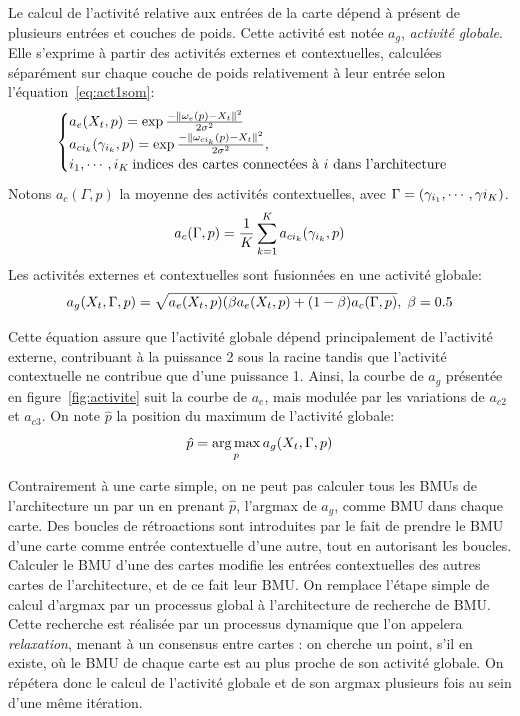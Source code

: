 Le calcul de l'activité relative aux entrées de la carte dépend à présent de plusieurs entrées et couches de poids. Cette activité est notée $a_g$, \emph{activité globale}.
Elle s'exprime à partir des activités externes et contextuelles, calculées séparément sur chaque couche de poids relativement à leur entrée selon l'équation~\ref{eq:act1som}:
\begin{equation}
\label{eq:activite}
\begin{cases}
a_e(X_t,p) = \exp\frac{-\lVert \omega_e(p)-X_t \rVert^2}{2\sigma^2} \\
a_{ci_k}(\gamma_{i_k},p) = \exp\frac{-\lVert \omega_{ci_k}(p)-X_t \rVert ^2}{2\sigma^2}, \\
i_1, \cdots, i_K\: \text{indices des cartes connectées à $i$ dans l'architecture}
\end{cases}
\end{equation}
Notons $a_c(\Gamma,p)$ la moyenne des activités contextuelles, avec $\Gamma = (\gamma_{i_1}, \cdots, \gamma{i_K})$.
\begin{equation}
a_c(\Gamma,p) = \frac{1}{K}\sum_{k=1}^K {a_{ci_k}(\gamma_{i_k},p)}
\end{equation}
Les activités externes et contextuelles sont fusionnées en une activité globale:
\begin{equation}
\label{eq:global_act}
a_g(X_t,\Gamma,p) = \sqrt{a_e(X_t,p)(\beta a_e(X_t,p) + (1-\beta) a_c(\Gamma,p)}, \; \beta=0.5
\end{equation} 

Cette équation assure que l'activité globale dépend principalement de l'activité externe, contribuant à la puissance 2 sous la racine tandis que l'activité contextuelle ne contribue que d'une puissance 1. Ainsi, la courbe de $a_g$ présentée en figure~\ref{fig:activite} suit la courbe de $a_e$, mais modulée par les variations de $a_{c2}$ et $a_{c3}$.
On note $\hat{p}$ la position du maximum de l'activité globale:
\begin{equation}
\label{argmax}
\hat{p} = \operatorname*{arg\,max}_p a_g(X_t, \Gamma,p)
\end{equation}

Contrairement à une carte simple, on ne peut pas calculer tous les BMUs de l'architecture un par un en prenant $\hat{p}$, l'argmax de $a_g$, comme BMU dans chaque carte. Des boucles de rétroactions sont introduites par le fait de prendre le BMU d'une carte comme entrée contextuelle d'une autre, tout en autorisant les boucles. Calculer le BMU d'une des cartes modifie les entrées contextuelles des autres cartes de l'architecture, et de ce fait leur BMU. 
On remplace l'étape simple de calcul d'argmax par un processus global à l'architecture de recherche de BMU. Cette recherche est réalisée par un processus dynamique que l'on appelera \emph{relaxation}, menant à un consensus entre cartes : on cherche un point, s'il en existe, où le BMU de chaque carte est au plus proche de son activité globale. On répétera donc le calcul de l'activité globale et de son argmax plusieurs fois au sein d'une même itération.

